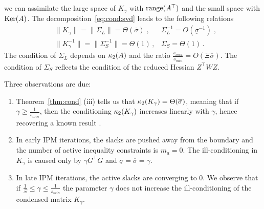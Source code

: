we can assimilate the large space of $K_\gamma$ with $\operatorname{range}(A^\top)$
and the small space with $\operatorname{Ker}(A)$.
The decomposition~\eqref{eq:cond:svd} leads to the following relations
\begin{equation}
  \label{eq:cond:boundinvariantsubspace}
  \begin{aligned}
    & \| K_\gamma \| = \| \Sigma_L \| = \Theta(\overline{\sigma}) \; , &
    \Sigma_L^{-1} = O(\underline{\sigma}^{-1})  \;, \\
    & \| K_\gamma^{-1} \| = \| \Sigma_S^{-1} \| = \Theta(1) \, , &
  \Sigma_S = \Theta(1) \, .
  \end{aligned}
\end{equation}
The condition of $\Sigma_L$ depends on $\kappa_2(A)$
and the ratio $\frac{s_{max}}{s_{min}} = O(\Xi \overline{\sigma})$.
The condition of $\Sigma_S$ reflects the condition of the reduced Hessian $Z^\top W Z$.

Three observations are due:
\begin{enumerate}
  \item Theorem~\ref{thm:cond} (iii) tells us that $\kappa_2(K_\gamma) = \Theta(\overline{\sigma})$,
    meaning that if $\gamma \geq \frac{1}{s_{min}}$, then
    the conditioning $\kappa_2(K_\gamma)$ increases linearly with $\gamma$, hence
    recovering a known result \cite{regev2023hykkt}.
  \item In early IPM iterations, the slacks are pushed away from the boundary
    and the number of active inequality constraints is $m_a = 0$. The ill-conditioning
    in $K_\gamma$ is caused only by $\gamma G^\top G$ and $\underline{\sigma} = \overline{\sigma} = \gamma$.
  \item In late IPM iterations, the active slacks are converging to $0$. We observe
    that if $\frac{1}{\Xi} \leq \gamma \leq \frac{1}{s_{min}}$ the parameter $\gamma$
    does not increase the ill-conditioning of the condensed matrix $K_\gamma$.
\end{enumerate}

